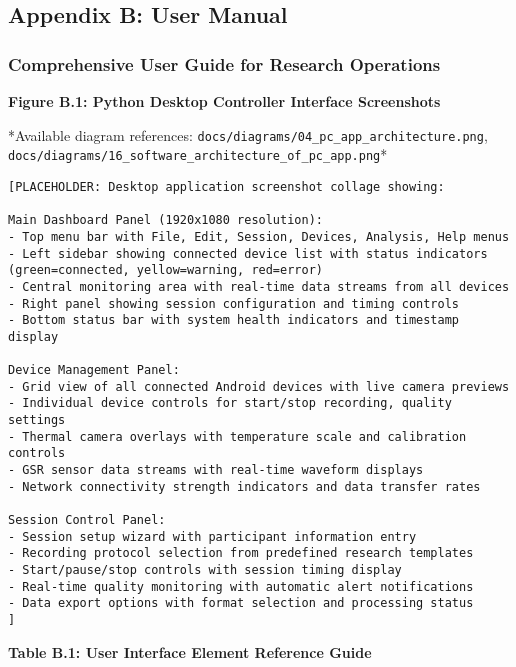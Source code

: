 \documentclass[11pt,a4paper]{article}
\begin{document}
\subsection{Appendix B: User Manual}

\subsubsection{Comprehensive User Guide for Research Operations}

\textbf{Figure B.1: Python Desktop Controller Interface Screenshots}

*Available diagram
references: \texttt{docs/diagrams/04\_pc\_app\_architecture.png}, \texttt{docs/diagrams/16\_software\_architecture\_of\_pc\_app.png}*

\begin{verbatim}
[PLACEHOLDER: Desktop application screenshot collage showing:

Main Dashboard Panel (1920x1080 resolution):
- Top menu bar with File, Edit, Session, Devices, Analysis, Help menus
- Left sidebar showing connected device list with status indicators (green=connected, yellow=warning, red=error)
- Central monitoring area with real-time data streams from all devices
- Right panel showing session configuration and timing controls
- Bottom status bar with system health indicators and timestamp display

Device Management Panel:
- Grid view of all connected Android devices with live camera previews
- Individual device controls for start/stop recording, quality settings
- Thermal camera overlays with temperature scale and calibration controls
- GSR sensor data streams with real-time waveform displays
- Network connectivity strength indicators and data transfer rates

Session Control Panel:
- Session setup wizard with participant information entry
- Recording protocol selection from predefined research templates
- Start/pause/stop controls with session timing display
- Real-time quality monitoring with automatic alert notifications
- Data export options with format selection and processing status
]
\end{verbatim}

\textbf{Table B.1: User Interface Element Reference Guide}
\end{document}
